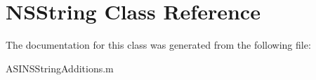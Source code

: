\hypertarget{class_n_s_string}{
\section{NSString Class Reference}
\label{class_n_s_string}
}


The documentation for this class was generated from the following file:\begin{DoxyCompactItemize}
\item 
ASINSStringAdditions.m\end{DoxyCompactItemize}
